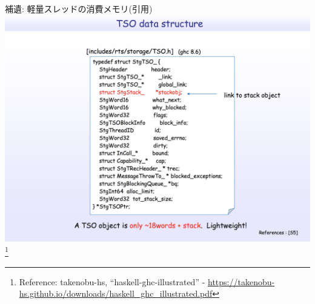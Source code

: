 \documentclass[unicode,12pt]{beamer}
\begin{document}
\begin{frame}[plain]{補遺: 軽量スレッドの消費メモリ(引用)}
  \centering
  \includegraphics[width=.7\textwidth]{pic/tso.png}
  \footnote{Reference: takenobu-hs, ``haskell-ghc-illustrated'' - \url{https://takenobu-hs.github.io/downloads/haskell_ghc_illustrated.pdf}}
\end{frame}
\end{document}
